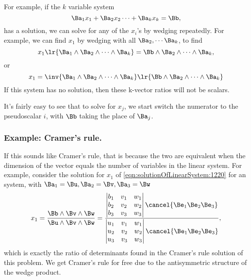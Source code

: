 For example, if the \( k \) variable system
\begin{equation}\label{eqn:solutionOfLinearSystem:1220}
\Ba_1 x_1 + \Ba_2 x_2 \cdots + \Ba_k x_k = \Bb,
\end{equation}
has a solution, we can solve for any of the \( x_i \)'s by wedging repeatedly.  For example, we can find \( x_1 \)
by wedging with all \( \Ba_2, \cdots \Ba_k \), to find
\begin{equation}\label{eqn:solutionOfLinearSystem:102}
x_1 \lr{ \Ba_1 \wedge \Ba_2 \wedge \cdots \wedge \Ba_k } = \Bb \wedge \Ba_2 \wedge \cdots \wedge \Ba_k,
\end{equation}
or
\begin{equation}\label{eqn:solutionOfLinearSystem:103}
x_1 = \inv{ \Ba_1 \wedge \Ba_2 \wedge \cdots \wedge \Ba_k } \lr{ \Bb \wedge \Ba_2 \wedge \cdots \wedge \Ba_k }
\end{equation}
If this system has no solution, then these k-vector ratios will not be scalars.

It's fairly easy to see that to solve for \( x_j \), we start switch the numerator to the pseudoscalar \( i \), with \( \Bb \) taking the place of \( \Ba_j \).
\subsubsection{Example:  Cramer's rule.}
If this sounds like Cramer's rule, that is because the two are equivalent when the dimension of the vector equals the number of variables in the linear system.
For example, consider the solution for \( x_1 \) of \cref{eqn:solutionOfLinearSystem:1220} for an  system, with \( \Ba_1 = \Bu, \Ba_2 = \Bv, \Ba_3 = \Bw \)
\begin{equation}\label{eqn:solutionOfLinearSystem:1260}
x_1 =
\frac{ \Bb \wedge \Bv \wedge \Bw }
{ \Bu \wedge \Bv \wedge \Bw }
=
\frac{
\begin{vmatrix}
b_1 & v_1 & w_1 \\
b_2 & v_2 & w_2 \\
b_3 & v_3 & w_3 \\
\end{vmatrix}
\cancel{\Be_1 \Be_2 \Be_3}
}
{
\begin{vmatrix}
u_1 & v_1 & w_1 \\
u_2 & v_2 & w_2 \\
u_3 & v_3 & w_3 \\
\end{vmatrix}
\cancel{\Be_1 \Be_2 \Be_3}
},
\end{equation}
which is exactly the ratio of determinants found in the Cramer's rule solution of this problem.  We get Cramer's rule for free due to the antisymmetric structure of the wedge product.

